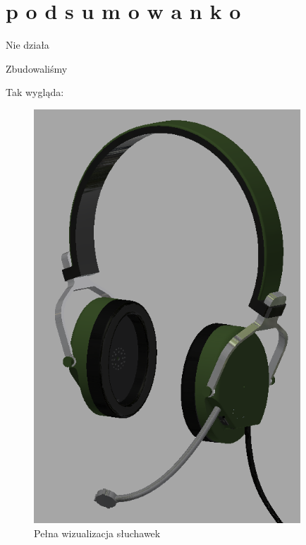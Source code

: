 \chapter{p o d s u m o w a n k o}
\label{cha:podsumowanie}

Nie działa

Zbudowaliśmy

Tak wygląda:

\begin{figure}[H]
	\centering
	\includegraphics[width=10cm]{zdjecia/model/full_model.png}
	\caption{\label{pic:full_model}Pełna wizualizacja słuchawek}
\end{figure}
